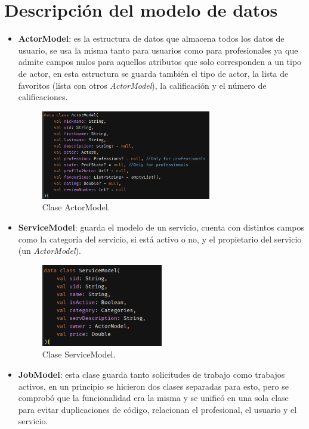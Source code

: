 \section{Descripción del modelo de datos}
\begin{itemize}
    \item \textbf{ActorModel}: es la estructura de datos que almacena todos los datos de usuario, se usa la misma tanto para usuarios como para profesionales ya que admite campos nulos para aquellos atributos que solo corresponden a un tipo de actor, en esta estructura se guarda también el tipo de actor, la lista de favoritos (lista con otros \textit{ActorModel}), la calificación y el número de calificaciones.
    \begin{figure}[h]
        \centering
        \includegraphics[width = 0.7\textwidth]{Imagenes/Fuentes/actorModel.png}
        \caption{Clase ActorModel.}
        \label{fig:actorModel}
    \end{figure}
    \item \textbf{ServiceModel}: guarda el modelo de un servicio, cuenta con distintos campos como la categoría del servicio, si está activo o no, y el propietario del servicio (un \textit{ActorModel}).
    \begin{figure}[h]
        \centering
        \includegraphics[width = 0.5\textwidth]{Imagenes/Fuentes/ServiceModel.png}
        \caption{Clase ServiceModel.}
        \label{fig:ServiceModel}
    \end{figure}
    \item \textbf{JobModel}: esta clase guarda tanto solicitudes de trabajo como trabajos activos, en un principio se hicieron dos clases separadas para esto, pero se comprobó que la funcionalidad era la misma y se unificó en una sola clase para evitar duplicaciones de código, relacionan el profesional, el usuario y el servicio.

\end{itemize}
